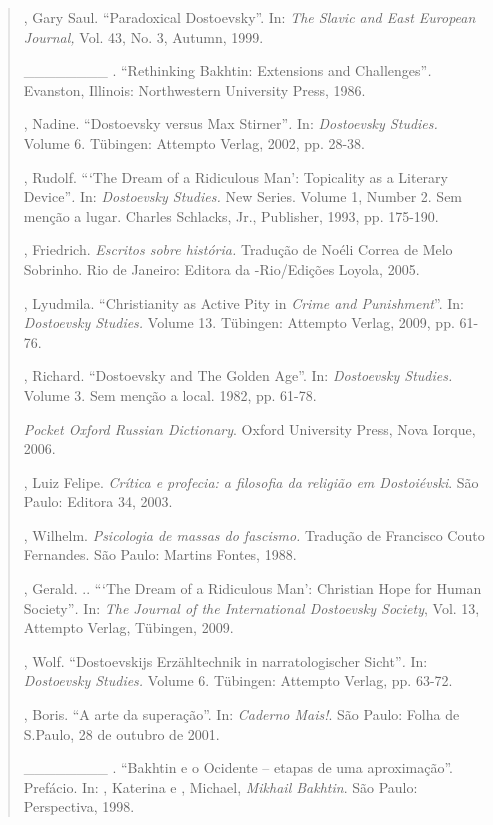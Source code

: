 {\begin{quote}
\begin{Parskip}
, Gary Saul. ``Paradoxical Dostoevsky''. In: \emph{The Slavic and
East European Journal,} Vol. 43, No. 3, Autumn, 1999.

\_\_\_\_\_\_\_\_ . ``Rethinking Bakhtin: Extensions and
Challenges''\emph{.} Evanston, Illinois: Northwestern University Press,
1986.

, Nadine. ``Dostoevsky versus Max Stirner''\emph{.} In:
\emph{Dostoevsky Studies.} Volume 6. Tübingen: Attempto Verlag, 2002,
pp. 28-38.

, Rudolf. ```The Dream of a Ridiculous Man': Topicality as a
Literary Device''\emph{.} In: \emph{Dostoevsky Studies.} New Series.
Volume 1, Number 2. Sem menção a lugar. Charles Schlacks, Jr.,
Publisher, 1993, pp. 175-190.

, Friedrich. \emph{Escritos sobre história.} Tradução de Noéli
Correa de Melo Sobrinho. Rio de Janeiro: Editora da -Rio/Edições
Loyola, 2005.

, Lyudmila. ``Christianity as Active Pity in \emph{Crime and
Punishment}''. In: \emph{Dostoevsky Studies.} Volume 13. Tübingen:
Attempto Verlag, 2009, pp. 61-76.

, Richard. ``Dostoevsky and The Golden Age''. In: \emph{Dostoevsky
Studies.} Volume 3. Sem menção a local. 1982, pp. 61-78.

\emph{Pocket Oxford Russian Dictionary}. Oxford University Press, Nova
Iorque, 2006.

, Luiz Felipe. \emph{Crítica e profecia: a filosofia da religião em
Dostoiévski}. São Paulo: Editora 34, 2003.

, Wilhelm. \emph{Psicologia de massas do fascismo.} Tradução de
Francisco Couto Fernandes. São Paulo: Martins Fontes, 1988.

, Gerald. .. ```The Dream of a Ridiculous Man': Christian Hope for
Human Society''\emph{.} In: \emph{The Journal of the International
Dostoevsky Society}, Vol. 13, Attempto Verlag, Tübingen, 2009.

, Wolf. ``Dostoevskijs Erzähltechnik in narratologischer
Sicht''\emph{.} In: \emph{Dostoevsky Studies.} Volume 6. Tübingen:
Attempto Verlag, pp. 63-72.

, Boris. ``A arte da superação''. In: \emph{Caderno Mais!}.
São Paulo: Folha de S.Paulo, 28 de outubro de 2001.

\_\_\_\_\_\_\_\_ . ``Bakhtin e o Ocidente -- etapas de uma
aproximação''. Prefácio. In: , Katerina e , Michael,
\emph{Mikhail Bakhtin}. São Paulo: Perspectiva, 1998.


\end{Parskip}
\end{quote}}
